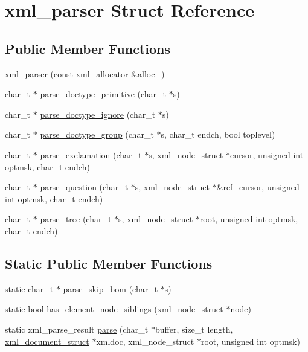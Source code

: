 \hypertarget{structxml__parser}{\section{xml\-\_\-parser Struct Reference}
\label{structxml__parser}
}
\subsection*{Public Member Functions}
\begin{DoxyCompactItemize}
\item 
\hyperlink{structxml__parser_acc030c4ed339b238e1ff2d3e6fa7188b}{xml\-\_\-parser} (const \hyperlink{structxml__allocator}{xml\-\_\-allocator} \&alloc\-\_\-)
\item 
char\-\_\-t $\ast$ \hyperlink{structxml__parser_a722853b603ad9a1d1f61bb8115bea5b4}{parse\-\_\-doctype\-\_\-primitive} (char\-\_\-t $\ast$s)
\item 
char\-\_\-t $\ast$ \hyperlink{structxml__parser_a1e996ac9c9993f1939128859596376a1}{parse\-\_\-doctype\-\_\-ignore} (char\-\_\-t $\ast$s)
\item 
char\-\_\-t $\ast$ \hyperlink{structxml__parser_a9bc0e5f3d75cd7edb267a85430e1cdfc}{parse\-\_\-doctype\-\_\-group} (char\-\_\-t $\ast$s, char\-\_\-t endch, bool toplevel)
\item 
char\-\_\-t $\ast$ \hyperlink{structxml__parser_a40da52e4b27a0a06752930a0edf16fe9}{parse\-\_\-exclamation} (char\-\_\-t $\ast$s, xml\-\_\-node\-\_\-struct $\ast$cursor, unsigned int optmsk, char\-\_\-t endch)
\item 
char\-\_\-t $\ast$ \hyperlink{structxml__parser_a2b0edc4fbf2ff448b4d5b31593c5c4fd}{parse\-\_\-question} (char\-\_\-t $\ast$s, xml\-\_\-node\-\_\-struct $\ast$\&ref\-\_\-cursor, unsigned int optmsk, char\-\_\-t endch)
\item 
char\-\_\-t $\ast$ \hyperlink{structxml__parser_a96e76ebea8834b3e56e1c8646e593da4}{parse\-\_\-tree} (char\-\_\-t $\ast$s, xml\-\_\-node\-\_\-struct $\ast$root, unsigned int optmsk, char\-\_\-t endch)
\end{DoxyCompactItemize}
\subsection*{Static Public Member Functions}
\begin{DoxyCompactItemize}
\item 
static char\-\_\-t $\ast$ \hyperlink{structxml__parser_af0a3f5a488b05da9fa2c87e1dd1f9eda}{parse\-\_\-skip\-\_\-bom} (char\-\_\-t $\ast$s)
\item 
static bool \hyperlink{structxml__parser_a6be4da5b3206913d0e3bd8320394df41}{has\-\_\-element\-\_\-node\-\_\-siblings} (xml\-\_\-node\-\_\-struct $\ast$node)
\item 
static xml\-\_\-parse\-\_\-result \hyperlink{structxml__parser_a4bf0acd166edf3fc6cc9543002ff6f5d}{parse} (char\-\_\-t $\ast$buffer, size\-\_\-t length, \hyperlink{structxml__document__struct}{xml\-\_\-document\-\_\-struct} $\ast$xmldoc, xml\-\_\-node\-\_\-struct $\ast$root, unsigned int optmsk)
\end{DoxyCompactItemize}

